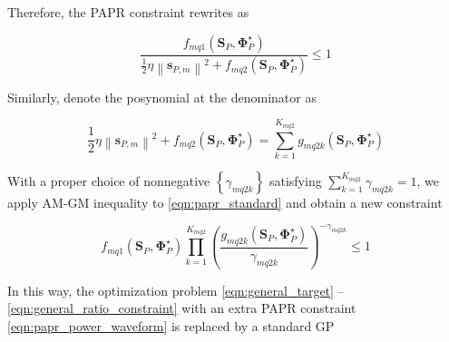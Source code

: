 Therefore, the PAPR constraint rewrites as

\begin{equation}\label{eqn:papr_standard}
  \frac{{{f_{mq1}}\left( {{{\mathbf{S}}_P},{\mathbf{\Phi }}_P^ \star } \right)}}{{\frac{1}{2}\eta {{\left\| {{{\mathbf{s}}_{P,m}}} \right\|}^2} + {f_{mq2}}\left( {{{\mathbf{S}}_P},{\mathbf{\Phi }}_P^ \star } \right)}} \leqslant 1
\end{equation}

Similarly, denote the posynomial at the denominator as

\begin{equation}\label{eqn:papr_denominator}
  \frac{1}{2}\eta {\left\| {{{\mathbf{s}}_{P,m}}} \right\|^2} + {f_{mq2}}\left( {{{\mathbf{S}}_P},{\mathbf{\Phi }}_P^ \star } \right) = \sum\limits_{k = 1}^{{K_{mq2}}} {{g_{mq2k}}} \left( {{{\mathbf{S}}_P},{\mathbf{\Phi }}_P^ \star } \right)
\end{equation}

With a proper choice of nonnegative $\left\{ {{\gamma _{mq2k}}} \right\}$ satisfying $\sum\nolimits_{k = 1}^{{K_{mq2}}} {{\gamma _{mq2k}}}  = 1$, we apply AM-GM inequality to \eqref{eqn:papr_standard} and obtain a new constraint

\begin{equation}\label{eqn:papr_equivalent_inequality}
  {f_{mq1}}\left( {{{\mathbf{S}}_P},{\mathbf{\Phi }}_P^ \star } \right)\prod\limits_{k = 1}^{{K_{mq2}}} {{{\left( {\frac{{{g_{mq2k}}\left( {{{\mathbf{S}}_P},{\mathbf{\Phi }}_P^ \star } \right)}}{{{\gamma _{mq2k}}}}} \right)}^{ - {\gamma _{mq2k}}}}}  \leqslant 1
\end{equation}

In this way, the optimization problem \eqref{eqn:general_target} -- \eqref{eqn:general_ratio_constraint} with an extra PAPR constraint \eqref{eqn:papr_power_waveform} is replaced by a standard GP

